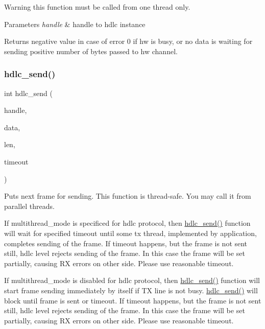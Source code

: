 \begin{DoxyWarning}{Warning}
this function must be called from one thread only.
\end{DoxyWarning}

\begin{DoxyParams}{Parameters}
{\em handle} & handle to hdlc instance \\
\hline
\end{DoxyParams}
\begin{DoxyReturn}{Returns}
negative value in case of error 0 if hw is busy, or no data is waiting for sending positive number of bytes passed to hw channel. 
\end{DoxyReturn}
\mbox{\label{group__HDLC__API_ga8b5cc456927145cebd82b2b560a6fa10}} 
\subsubsection{\texorpdfstring{hdlc\+\_\+send()}{hdlc\_send()}}
{\footnotesize\ttfamily int hdlc\+\_\+send (\begin{DoxyParamCaption}\item[{\hyperlink{group__HDLC__API_gabeaf7578aed5279d3af891bd85a9f961}{hdlc\+\_\+handle\+\_\+t}}]{handle,  }\item[{const void $\ast$}]{data,  }\item[{int}]{len,  }\item[{uint32\+\_\+t}]{timeout }\end{DoxyParamCaption})}

Puts next frame for sending. This function is thread-\/safe. You may call it from parallel threads.

If multithread\+\_\+mode is specificed for hdlc protocol, then \hyperlink{group__HDLC__API_ga8b5cc456927145cebd82b2b560a6fa10}{hdlc\+\_\+send()} function will wait for specified timeout until some tx thread, implemented by application, completes sending of the frame. If timeout happens, but the frame is not sent still, hdlc level rejects sending of the frame. In this case the frame will be set partially, causing RX errors on other side. Please use reasonable timeout.

If multithread\+\_\+mode is disabled for hdlc protocol, then \hyperlink{group__HDLC__API_ga8b5cc456927145cebd82b2b560a6fa10}{hdlc\+\_\+send()} function will start frame sending immediately by itself if TX line is not busy. \hyperlink{group__HDLC__API_ga8b5cc456927145cebd82b2b560a6fa10}{hdlc\+\_\+send()} will block until frame is sent or timeout. If timeout happens, but the frame is not sent still, hdlc level rejects sending of the frame. In this case the frame will be set partially, causing RX errors on other side. Please use reasonable timeout.


